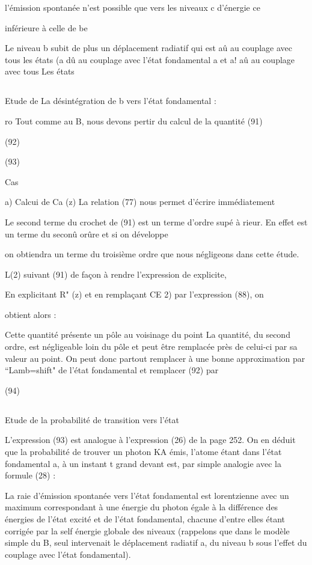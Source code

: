  l'émission spontanée n'est possible que vers les niveaux c d'énergie
ce

inférieure à celle de be

Le niveau b subit de plus un déplacement radiatif qui est aû au
couplage avec tous les états (a dû au couplage avec l'état fondamental a et
a! aû au couplage avec tous Les états

\subsection{} Etude de La désintégration de b vers l'état fondamental :%

ro Tout comme au  B, nous devons pertir du calcul de la quantité
(91)

(92)

(93)

Cas

a) Calcui de Ca (z)
La relation (77) nous permet d'écrire immédiatement

Le second terme du crochet de (91) est un terme d'ordre supé
à 
rieur. En effet  est un terme du seconû orûre et si on développe

on obtiendra un terme du troisième ordre que nous négligeons dans cette étude.

L(2) suivant (91) de façon à rendre l'expression de  explicite,

En explicitant R" (z) et en remplaçant CE 2) par l'expression (88), on

obtient alors :

Cette quantité présente un pôle au voisinage du point
La quantité, du second ordre, est négligeable loin du pôle et peut
être remplacée près de celui-ci par sa valeur au point. On peut
donc partout remplacer à une bonne approximation  par
 “Lamb=shift" de l'état fondamental et remplacer (92) par


(94)


\subsection{} Etude de la probabilité de transition vers l'état%

L'expression (93) est analogue à l'expression (26)
de la page 252. On en déduit que la probabilité de trouver un photon KA
émis, l'atome étant dans l'état fondamental a, à un instant t grand devant
 est, par simple analogie avec la formule (28) :

La raie d'émission spontanée vers l'état fondamental est lorentzienne avec
un maximum correspondant à une énergie du photon égale à la différence des
énergies de l'état excité et de l'état fondamental, chacune d'entre elles
étant corrigée par la self énergie globale des niveaux (rappelons que dans
le modèle simple du  B, seul intervenait le déplacement radiatif a, du
niveau b sous l'effet du couplage avec l'état fondamental).

